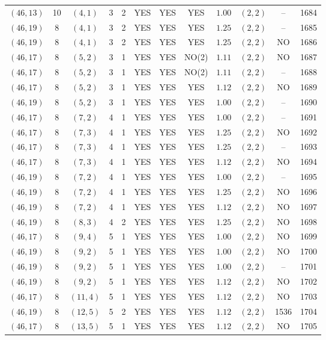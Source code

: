 \begin{longtable}{|c|c|c|c|c|c|c|c|c|c|c|c|}
$(46,13)$ & 10 & $(4,1)$ & 3 & 2 & YES & YES & YES & $1.00$ & $(2,2)$ & -- & 1684\\
$(46,19)$ & 8 & $(4,1)$ & 3 & 2 & YES & YES & YES & $1.25$ & $(2,2)$ & -- & 1685\\
$(46,19)$ & 8 & $(4,1)$ & 3 & 2 & YES & YES & YES & $1.25$ & $(2,2)$ & NO & 1686\\
$(46,17)$ & 8 & $(5,2)$ & 3 & 1 & YES & YES & NO(2) & $1.11$ & $(2,2)$ & NO & 1687\\
$(46,17)$ & 8 & $(5,2)$ & 3 & 1 & YES & YES & NO(2) & $1.11$ & $(2,2)$ & -- & 1688\\
$(46,17)$ & 8 & $(5,2)$ & 3 & 1 & YES & YES & YES & $1.12$ & $(2,2)$ & NO & 1689\\
$(46,19)$ & 8 & $(5,2)$ & 3 & 1 & YES & YES & YES & $1.00$ & $(2,2)$ & -- & 1690\\
$(46,17)$ & 8 & $(7,2)$ & 4 & 1 & YES & YES & YES & $1.00$ & $(2,2)$ & -- & 1691\\
$(46,17)$ & 8 & $(7,3)$ & 4 & 1 & YES & YES & YES & $1.25$ & $(2,2)$ & NO & 1692\\
$(46,17)$ & 8 & $(7,3)$ & 4 & 1 & YES & YES & YES & $1.25$ & $(2,2)$ & -- & 1693\\
$(46,17)$ & 8 & $(7,3)$ & 4 & 1 & YES & YES & YES & $1.12$ & $(2,2)$ & NO & 1694\\
$(46,19)$ & 8 & $(7,2)$ & 4 & 1 & YES & YES & YES & $1.00$ & $(2,2)$ & -- & 1695\\
$(46,19)$ & 8 & $(7,2)$ & 4 & 1 & YES & YES & YES & $1.25$ & $(2,2)$ & NO & 1696\\
$(46,19)$ & 8 & $(7,2)$ & 4 & 1 & YES & YES & YES & $1.12$ & $(2,2)$ & NO & 1697\\
$(46,19)$ & 8 & $(8,3)$ & 4 & 2 & YES & YES & YES & $1.25$ & $(2,2)$ & NO & 1698\\
$(46,17)$ & 8 & $(9,4)$ & 5 & 1 & YES & YES & YES & $1.00$ & $(2,2)$ & NO & 1699\\
$(46,19)$ & 8 & $(9,2)$ & 5 & 1 & YES & YES & YES & $1.00$ & $(2,2)$ & NO & 1700\\
$(46,19)$ & 8 & $(9,2)$ & 5 & 1 & YES & YES & YES & $1.00$ & $(2,2)$ & -- & 1701\\
$(46,19)$ & 8 & $(9,2)$ & 5 & 1 & YES & YES & YES & $1.12$ & $(2,2)$ & NO & 1702\\
$(46,17)$ & 8 & $(11,4)$ & 5 & 1 & YES & YES & YES & $1.12$ & $(2,2)$ & NO & 1703\\
$(46,19)$ & 8 & $(12,5)$ & 5 & 2 & YES & YES & YES & $1.12$ & $(2,2)$ & 1536 & 1704\\
$(46,17)$ & 8 & $(13,5)$ & 5 & 1 & YES & YES & YES & $1.12$ & $(2,2)$ & NO & 1705\\

\end{longtable}
